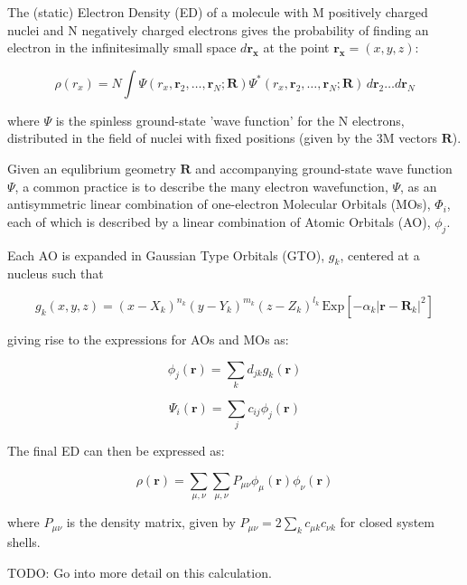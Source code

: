 
The (static) Electron Density (ED) of a molecule with M positively charged nuclei  and N negatively charged
electrons gives the probability of finding an electron in the infinitesimally small space
$d \mathbf{r_x}$ at the point $\mathbf{r_x} = (x, y, z)$:

$$
\rho(r_x) = N \int \Psi(r_x, \mathbf{r}_2, \ldots, \mathbf{r}_N; \mathbf{R}) \Psi^*(r_x, \mathbf{r}_2, \ldots, \mathbf{r}_N; \mathbf{R}) \, d\mathbf{r}_2 \ldots d\mathbf{r}_N
$$

where $\Psi$ is the spinless ground-state 'wave function' for the N electrons, distributed in the field of nuclei with fixed positions
(given by the 3M vectors $\mathbf{R}$).


Given an equlibrium geometry $\mathbf{R}$ and accompanying ground-state wave function $\Psi$, a common practice
is to describe the many electron wavefunction, $\Psi$, as an antisymmetric linear combination of one-electron Molecular Orbitals (MOs), $\Phi_i$,
each of which is described by a linear combination of Atomic Orbitals (AO), $\phi_j$.

Each AO is expanded in Gaussian Type Orbitals (GTO), $g_k$, centered at a nucleus such that

$$
g_k(x, y, z) = (x - X_k)^{n_k} (y - Y_k)^{m_k} (z - Z_k)^{l_k} \, \mathrm{Exp}\left[-\alpha_k \left| \mathbf{r} - \mathbf{R}_k \right|^2 \right]
$$

giving rise to the expressions for AOs and MOs as:

$$
\phi_j(\mathbf{r}) = \sum_k d_{jk} g_k(\mathbf{r})
$$

$$
\Psi_i(\mathbf{r}) = \sum_j c_{ij} \phi_j(\mathbf{r})
$$

The final ED can then be expressed as:

$$
\rho(\mathbf{r}) = \sum_{\mu,\nu} \sum_{\mu,\nu} P_{\mu\nu} \phi_\mu(\mathbf{r}) \phi_\nu(\mathbf{r})
$$

where $P_{\mu\nu}$ is the density matrix, given by $P_{\mu\nu} = 2\sum_k c_{\mu k} c_{\nu k}$ for closed system shells.

TODO: Go into more detail on this calculation.
